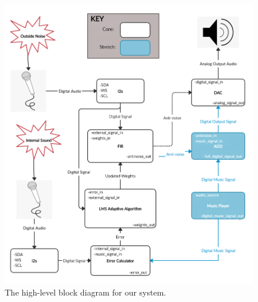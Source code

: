 \documentclass{fpgairpods}
\begin{document}
\begin{figure}
\includegraphics[width=\textwidth]{./figs/Proposal Block Diagram.png}
\caption{The high-level block diagram for our system.}
\label{fig:blockdiagram}
\end{figure}
\end{document}
